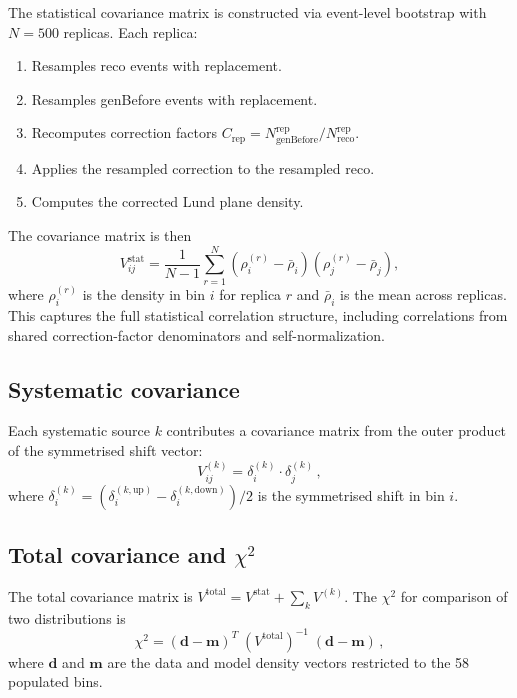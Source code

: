 \documentclass[11pt,a4paper]{article}
\begin{document}
The statistical covariance matrix is constructed via event-level
bootstrap with $N = 500$ replicas.  Each replica:
\begin{enumerate}
\item Resamples reco events with replacement.
\item Resamples genBefore events with replacement.
\item Recomputes correction factors
  $C_\text{rep} = N_\text{genBefore}^\text{rep} /
  N_\text{reco}^\text{rep}$.
\item Applies the resampled correction to the resampled reco.
\item Computes the corrected Lund plane density.
\end{enumerate}

The covariance matrix is then
\begin{equation}
  V_{ij}^\text{stat} = \frac{1}{N-1}
  \sum_{r=1}^{N}
  \left(\rho_i^{(r)} - \bar{\rho}_i\right)
  \left(\rho_j^{(r)} - \bar{\rho}_j\right),
  \label{eq:bootstrap-cov}
\end{equation}
where $\rho_i^{(r)}$ is the density in bin $i$ for replica $r$ and
$\bar{\rho}_i$ is the mean across replicas.  This captures the full
statistical correlation structure, including correlations from shared
correction-factor denominators and self-normalization.

\subsection{Systematic covariance}
\label{sec:syst-cov}

Each systematic source $k$ contributes a covariance matrix from the
outer product of the symmetrised shift vector:
\begin{equation}
  V_{ij}^{(k)} = \delta_i^{(k)} \cdot \delta_j^{(k)}\,,
  \label{eq:syst-cov}
\end{equation}
where $\delta_i^{(k)} = (\delta_i^{(k,\text{up})} -
\delta_i^{(k,\text{down})}) / 2$ is the symmetrised shift in bin $i$.

\subsection{Total covariance and $\chi^2$}
\label{sec:total-cov}

The total covariance matrix is
$V^\text{total} = V^\text{stat} + \sum_k V^{(k)}$.
The $\chi^2$ for comparison of two distributions is
\begin{equation}
  \chi^2 = (\mathbf{d} - \mathbf{m})^T\;
  (V^\text{total})^{-1}\;
  (\mathbf{d} - \mathbf{m})\,,
  \label{eq:chi2}
\end{equation}
where $\mathbf{d}$ and $\mathbf{m}$ are the data and model density
vectors restricted to the 58 populated bins.
\end{document}
